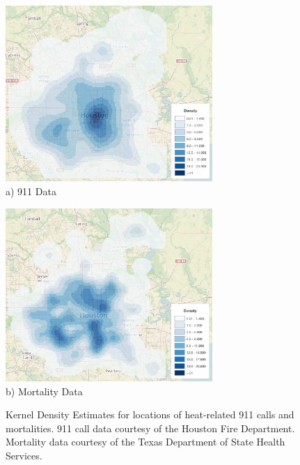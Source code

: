 \documentclass[final]{statsoc}
\begin{document}
\begin{figure}
  \centering
  \begin{minipage}[t]{1.0\textwidth}
    \centering
    \includegraphics[width=0.7\textwidth]{./imgs/911_kde.png}
    \\
    a) 911 Data
    \\
  \end{minipage}
  \vfill
  \begin{minipage}[t]{1.0\textwidth}
    \centering
    \includegraphics[width=0.7\textwidth]{./imgs/mortality_kde.png}
    \\
    b) Mortality Data
    \\
  \end{minipage}
  \caption{Kernel Density Estimates for locations of heat-related 911 calls and mortalities. 911 call data courtesy of the Houston Fire Department. Mortality data courtesy of the Texas Department of State Health Services.}
  \label{kde}
\end{figure}
\end{document}
